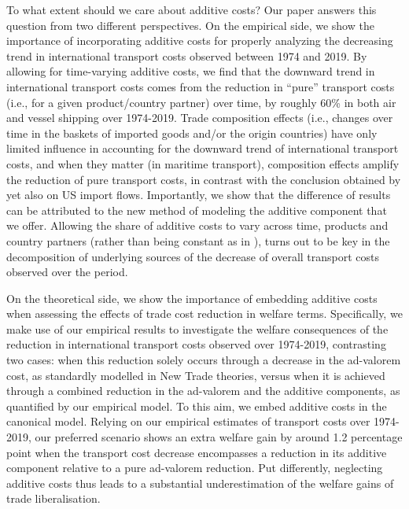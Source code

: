 \documentclass[a4paper,11pt]{article}
\begin{document}
To what extent should we care about additive costs? Our paper answers this question from two different perspectives.
On the empirical side, we show the importance of incorporating additive costs for properly analyzing the decreasing trend in international transport costs observed between 1974 and 2019. By allowing for time-varying additive costs, we find that the downward trend in international transport costs comes from the reduction in ``pure'' transport costs (i.e., for a given product/country partner) over time, by roughly 60\% in both air and vessel shipping over 1974-2019. Trade composition effects (i.e., changes over time in the baskets of imported goods and/or the origin countries) have only limited influence in accounting for the downward trend of international transport costs, and when they matter (in maritime transport), composition effects amplify the reduction of pure transport costs, in contrast with the conclusion obtained by \cite{hummels2007} yet also on US import flows.
Importantly, we show that the difference of results can be attributed to the new method of modeling the additive component that we offer. Allowing the share of additive costs to vary across time, products and country partners (rather than being constant as in \citealp{hummels2007}), turns out to be key in the decomposition of underlying sources of the decrease of overall transport costs observed over the period.\smallskip

On the theoretical side, we show the importance of embedding additive costs when assessing the effects of trade cost reduction in welfare terms. Specifically, we make use of our empirical results to investigate the welfare consequences of the reduction in international transport costs observed over 1974-2019, contrasting two cases: when this reduction solely occurs through a decrease in the ad-valorem cost, as standardly modelled in New Trade theories, versus when it is achieved through a combined reduction in the ad-valorem and the additive components, as quantified by our empirical model. To this aim, we embed additive costs in the canonical \cite{melitz} model. Relying on our empirical estimates of transport costs
over 1974-2019, our preferred scenario shows an extra welfare gain by around 1.2 percentage point when the transport cost decrease encompasses a reduction in its additive component relative to a pure ad-valorem reduction. Put differently, neglecting additive costs thus leads to a substantial underestimation of the welfare gains of trade liberalisation.
\end{document}
